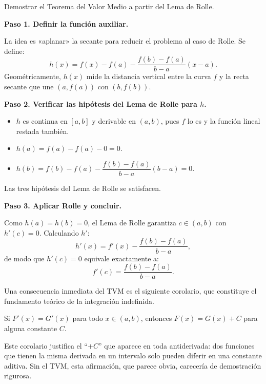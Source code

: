 \begin{example}
Demostrar el Teorema del Valor Medio a partir del Lema de Rolle.
\begin{myproof}
\textbf{Paso 1. Definir la función auxiliar.}

La idea es «aplanar» la secante para reducir el problema al caso de
Rolle. Se define:
\[
h(x) = f(x) - f(a) - \frac{f(b)-f(a)}{b-a}(x-a).
\]
Geométricamente, $h(x)$ mide la distancia vertical entre la curva $f$
y la recta secante que une $(a,f(a))$ con $(b,f(b))$.

\textbf{Paso 2. Verificar las hipótesis del Lema de Rolle para $h$.}

\begin{itemize}
    \item $h$ es continua en $[a,b]$ y derivable en $(a,b)$, pues $f$
    lo es y la función lineal restada también.
    \item $h(a) = f(a)-f(a)-0 = 0$.
    \item $h(b) = f(b)-f(a)-\dfrac{f(b)-f(a)}{b-a}(b-a) = 0$.
\end{itemize}

Las tres hipótesis del Lema de Rolle se satisfacen.

\textbf{Paso 3. Aplicar Rolle y concluir.}

Como $h(a)=h(b)=0$, el Lema de Rolle garantiza $c\in(a,b)$ con
$h'(c)=0$. Calculando $h'$:
\[
h'(x) = f'(x) - \frac{f(b)-f(a)}{b-a},
\]
de modo que $h'(c)=0$ equivale exactamente a:
\[
\boxed{f'(c) = \frac{f(b)-f(a)}{b-a}.}
\]
\end{myproof}
\end{example}

Una consecuencia inmediata del TVM es el siguiente corolario, que
constituye el fundamento teórico de la integración indefinida.

\begin{coro}
Si $F'(x)=G'(x)$ para todo $x\in(a,b)$, entonces $F(x)=G(x)+C$
para alguna constante $C$.
\end{coro}

\begin{rem}
Este corolario justifica el ``$+C$'' que aparece en toda antiderivada:
dos funciones que tienen la misma derivada en un intervalo solo pueden
diferir en una constante aditiva. Sin el TVM, esta afirmación, que
parece obvia, carecería de demostración rigurosa.
\end{rem}

